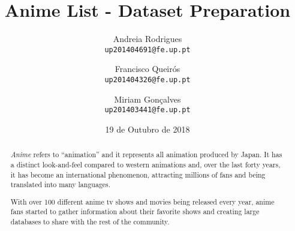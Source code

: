 \documentclass[twocolumn,twoside,11pt,a4paper]{article}
\title{\vspace{-15mm}\fontsize{24pt}{10pt}\selectfont\textbf{Anime List - Dataset Preparation}} %
\author{Andreia Rodrigues\\
\small \texttt{up201404691@fe.up.pt}\\
\and
Francisco Queirós\\
\small \texttt{up201404326@fe.up.pt}
\vspace{-5mm}\\
\and
Miriam Gonçalves\\
\small \texttt{up201403441@fe.up.pt}
\vspace{-5mm}\\
}
\date{19 de Outubro de 2018}
\begin{document}
\maketitle
\thispagestyle{plain}            %


\begin{abstract}
\textit{Anime} refers to “animation” and it represents all animation produced by Japan. It has a distinct look-and-feel compared to western animations and, over the last forty years, it has become an international phenomenon, attracting millions of fans and being translated into many languages.
\par
With over 100 different anime tv shows and movies being released every year, anime fans started to gather information about their favorite shows and creating large databases to share with the rest of the community.
\end{abstract}

\end{document}
